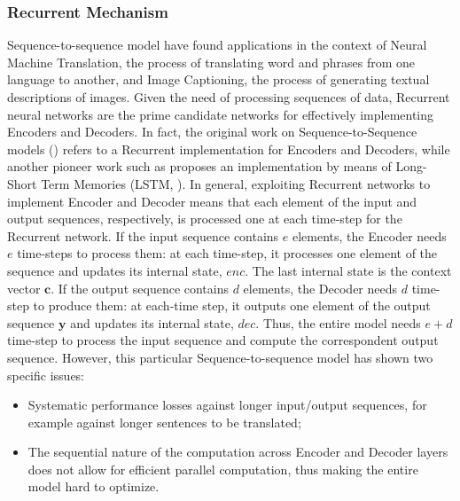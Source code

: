             \subsubsection{Recurrent Mechanism}
            \label{subsub:seq2seq_rnn}
                Sequence-to-sequence model have found applications in the context of Neural Machine Translation, the process of translating word and phrases from one language to another, and Image Captioning, the process of generating textual descriptions of images. Given the need of processing sequences of data, Recurrent neural networks are the prime candidate networks for effectively implementing Encoders and Decoders. In fact, the original work on Sequence-to-Sequence models () refers to a Recurrent implementation for Encoders and Decoders, while another pioneer work such as  proposes an implementation by means of Long-Short Term Memories (LSTM, ). \newline
                In general, exploiting Recurrent networks to implement Encoder and Decoder means that each element of the input and output sequences, respectively, is processed one at each time-step for the Recurrent network. If the input sequence contains $e$ elements, the Encoder needs $e$ time-steps to process them: at each time-step, it processes one element of the sequence and updates its internal state, $enc$. The last internal state is the context vector $\mathbf{c}$. If the output sequence contains $d$ elements, the Decoder needs $d$ time-step to produce them: at each-time step, it outputs one element of the output sequence $\mathbf{y}$ and updates its internal state, $dec$. Thus, the entire model needs $e+d$ time-step to process the input sequence and compute the correspondent output sequence.
                However, this particular Sequence-to-sequence model has shown two specific issues:
                \begin{itemize}[topsep=0.5em, partopsep=0.5em]
                    \setlength\itemsep{0em}
                    \item Systematic performance losses against longer input/output sequences, for example against longer sentences to be translated;
                    \item The sequential nature of the computation across Encoder and Decoder layers does not allow for efficient parallel computation, thus making the entire model hard to optimize.
                \end{itemize}
                
